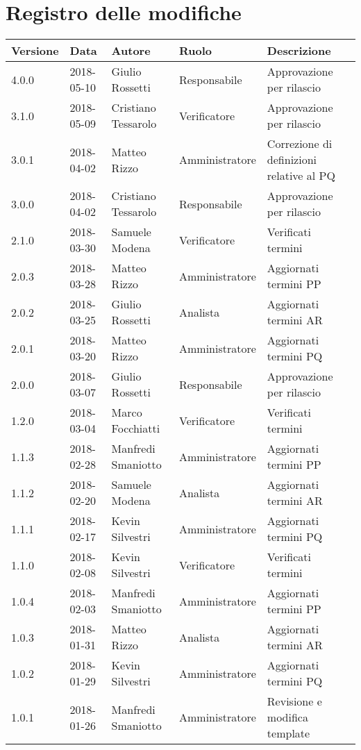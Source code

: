 \documentclass[./AnalisideiRequisiti.tex]{subfiles}
\begin{document}
	
{
	\chapter*{Registro delle modifiche}
\setlength\LTleft{-22mm}
	\begin{longtable}{|p{20mm}|p{20mm}|p{40mm}|p{30mm}|p{50mm}|}
		\hline
		\textbf{Versione} & \textbf{Data} & \textbf{Autore} & \textbf{Ruolo} & \textbf{Descrizione} \\ \hline 
		4.0.0 & 2018-05-10 & Giulio Rossetti & Responsabile & Approvazione per rilascio\\ \hline
		3.1.0 & 2018-05-09 & Cristiano Tessarolo & Verificatore & Approvazione per rilascio\\ \hline
		3.0.1 & 2018-04-02 & Matteo Rizzo & Amministratore & Correzione di definizioni relative al PQ \\ \hline
		3.0.0 & 2018-04-02 & Cristiano Tessarolo & Responsabile & Approvazione per rilascio\\ \hline
		2.1.0 & 2018-03-30 & Samuele Modena & Verificatore & Verificati termini\\ \hline
		2.0.3 & 2018-03-28 & Matteo Rizzo & Amministratore & Aggiornati termini PP\\ \hline
		2.0.2 & 2018-03-25 & Giulio Rossetti & Analista & Aggiornati termini AR \\ \hline		
		2.0.1 & 2018-03-20 & Matteo Rizzo & Amministratore & Aggiornati termini PQ\\ \hline
		
		2.0.0 & 2018-03-07 & Giulio Rossetti & Responsabile & Approvazione per rilascio\\ \hline
		1.2.0 & 2018-03-04 & Marco Focchiatti & Verificatore & Verificati termini\\ \hline
		1.1.3 & 2018-02-28 & Manfredi Smaniotto & Amministratore & Aggiornati termini PP\\ \hline
		1.1.2 & 2018-02-20 & Samuele Modena & Analista & Aggiornati termini AR \\ \hline		
		1.1.1 & 2018-02-17 & Kevin Silvestri & Amministratore & Aggiornati termini PQ\\
		\hline
		1.1.0 & 2018-02-08 & Kevin Silvestri & Verificatore & Verificati termini\\ \hline
		1.0.4 & 2018-02-03 & Manfredi Smaniotto & Amministratore & Aggiornati termini PP\\ \hline
		1.0.3 & 2018-01-31 & Matteo Rizzo & Analista & Aggiornati termini AR \\ \hline		
		1.0.2 & 2018-01-29 & Kevin Silvestri & Amministratore & Aggiornati termini PQ\\ \hline 
		1.0.1 & 2018-01-26 & Manfredi Smaniotto & Amministratore & Revisione e modifica template\\ \hline
		

\end{longtable}}
\end{document}
